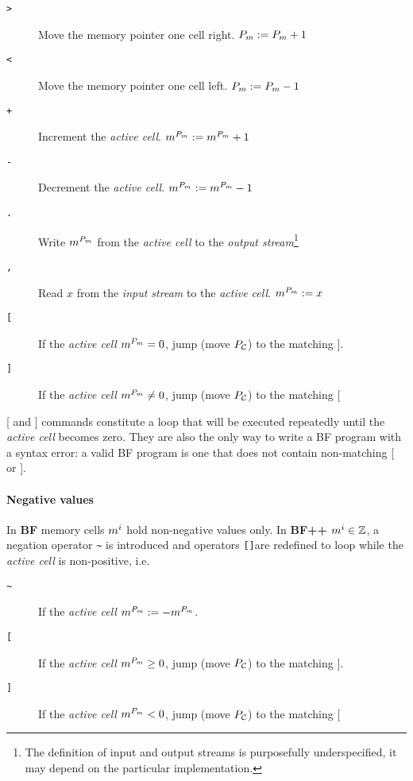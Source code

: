 \begin{description}
\item[\texttt{>}] Move the memory pointer one cell right. $P_m := P_m + 1$
\item[\texttt{<}] Move the memory pointer one cell left. $P_m := P_m - 1$
\item[\texttt{+}] Increment the \textit{active cell}. $m^{P_m} := m^{P_m} + 1$
\item[\texttt{-}] Decrement the \textit{active cell}. $m^{P_m} := m^{P_m} - 1$
\item[\texttt{.}] Write $m^{P_m}$ from the \textit{active cell} to the \textit{output stream}\footnote{The definition of input and output streams is purposefully underspecified, it may depend on the particular implementation.}
\item[\texttt{,}] Read $x$ from the \textit{input stream} to the \textit{active cell}. $m^{P_m} := x$
\item[ \texttt{[} ] If the \textit{active cell} $m^{P_m} = 0$, jump (move $P_{\mathcal{C}}$) to the matching $]$.
\item[ \texttt{]} ] If the \textit{active cell} $m^{P_m} \neq 0$, jump (move $P_{\mathcal{C}}$) to the matching $[$
\end{description}

[ and ] commands constitute a loop that will be executed repeatedly until the \textit{active cell} becomes zero.
They are also the only way to write a BF program with a syntax error: a valid BF program is one that does not contain non-matching [ or ].


\paragraph{Negative values}

In \textbf{BF} memory cells $m^i$ hold non-negative values only.
In \textbf{BF++} $m^i \in \mathbb{Z}$, a negation operator \texttt{\~} is introduced and operators \texttt{[]}are redefined to loop while the \textit{active cell} is non-positive, i.e.

\begin{description}
\item[ \texttt{\~} ] If the \textit{active cell} $m^{P_m} := - m^{P_m}$.
\item[ \texttt{[} ] If the \textit{active cell} $m^{P_m} \geq 0$, jump (move $P_{\mathcal{C}}$) to the matching $]$.
\item[ \texttt{]} ] If the \textit{active cell} $m^{P_m} < 0$, jump (move $P_{\mathcal{C}}$) to the matching $[$
\end{description}

